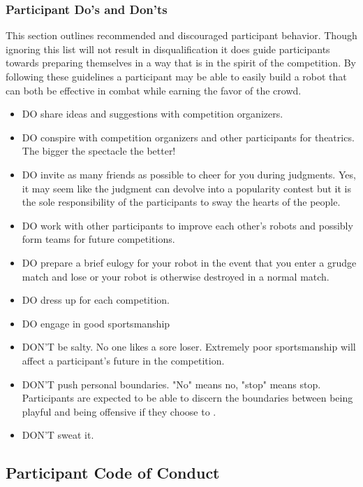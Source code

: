 \documentclass{article}
\begin{document}
	   \subsubsection {Participant Do's and Don'ts}	
	   	This section outlines recommended and discouraged participant behavior. Though ignoring this list will not result in disqualification it does guide participants towards preparing themselves in a way that is in the spirit of the competition. By following these guidelines a participant may be able to easily build a robot that can both be effective in combat while earning the favor of the crowd.
		\begin{itemize}
  			\item DO share ideas and suggestions with competition organizers.
 			\item DO conspire with competition organizers and other participants for theatrics. The bigger the
spectacle the better!
  			\item DO invite as many friends as possible to cheer for you during judgments. Yes, it may seem
like the judgment can devolve into a popularity contest but it is the sole responsibility of the
participants to sway the hearts of the people.
 			\item DO work with other participants to improve each other's robots and possibly form teams for
future competitions.
  			\item DO prepare a brief eulogy for your robot in the event that you enter a grudge match and
lose or your robot is otherwise destroyed in a normal match.
 			\item DO dress up for each competition.
  			\item DO engage in good sportsmanship
		\end{itemize}
		
		
				
		
		\begin{itemize}
  			\item DON'T be salty. No one likes a sore loser. Extremely poor sportsmanship will affect a participant's future in the competition.
 			\item DON'T push personal boundaries. "No" means no, "stop" means stop. Participants are expected to be able to discern the boundaries between being playful and being offensive if they choose to .
  			\item DON'T sweat it. 		
		\end{itemize}


	\subsection {Participant Code of Conduct}	
	
\end{document}
